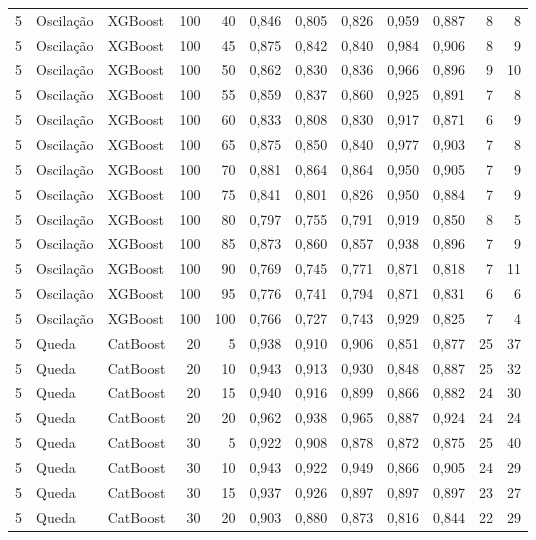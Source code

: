 \begin{longtable}{@{}rllrrrrrrrrr@{}}
5 & Oscilação & XGBoost & 100 & 40 & 0,846 & 0,805 & 0,826 & 0,959 & 0,887 & 8 & 8 \\
5 & Oscilação & XGBoost & 100 & 45 & 0,875 & 0,842 & 0,840 & 0,984 & 0,906 & 8 & 9 \\
5 & Oscilação & XGBoost & 100 & 50 & 0,862 & 0,830 & 0,836 & 0,966 & 0,896 & 9 & 10 \\
5 & Oscilação & XGBoost & 100 & 55 & 0,859 & 0,837 & 0,860 & 0,925 & 0,891 & 7 & 8 \\
5 & Oscilação & XGBoost & 100 & 60 & 0,833 & 0,808 & 0,830 & 0,917 & 0,871 & 6 & 9 \\
5 & Oscilação & XGBoost & 100 & 65 & 0,875 & 0,850 & 0,840 & 0,977 & 0,903 & 7 & 8 \\
5 & Oscilação & XGBoost & 100 & 70 & 0,881 & 0,864 & 0,864 & 0,950 & 0,905 & 7 & 9 \\
5 & Oscilação & XGBoost & 100 & 75 & 0,841 & 0,801 & 0,826 & 0,950 & 0,884 & 7 & 9 \\
5 & Oscilação & XGBoost & 100 & 80 & 0,797 & 0,755 & 0,791 & 0,919 & 0,850 & 8 & 5 \\
5 & Oscilação & XGBoost & 100 & 85 & 0,873 & 0,860 & 0,857 & 0,938 & 0,896 & 7 & 9 \\
5 & Oscilação & XGBoost & 100 & 90 & 0,769 & 0,745 & 0,771 & 0,871 & 0,818 & 7 & 11 \\
5 & Oscilação & XGBoost & 100 & 95 & 0,776 & 0,741 & 0,794 & 0,871 & 0,831 & 6 & 6 \\
5 & Oscilação & XGBoost & 100 & 100 & 0,766 & 0,727 & 0,743 & 0,929 & 0,825 & 7 & 4 \\
5 & Queda & CatBoost & 20 & 5 & 0,938 & 0,910 & 0,906 & 0,851 & 0,877 & 25 & 37 \\
5 & Queda & CatBoost & 20 & 10 & 0,943 & 0,913 & 0,930 & 0,848 & 0,887 & 25 & 32 \\
5 & Queda & CatBoost & 20 & 15 & 0,940 & 0,916 & 0,899 & 0,866 & 0,882 & 24 & 30 \\
5 & Queda & CatBoost & 20 & 20 & 0,962 & 0,938 & 0,965 & 0,887 & 0,924 & 24 & 24 \\
5 & Queda & CatBoost & 30 & 5 & 0,922 & 0,908 & 0,878 & 0,872 & 0,875 & 25 & 40 \\
5 & Queda & CatBoost & 30 & 10 & 0,943 & 0,922 & 0,949 & 0,866 & 0,905 & 24 & 29 \\
5 & Queda & CatBoost & 30 & 15 & 0,937 & 0,926 & 0,897 & 0,897 & 0,897 & 23 & 27 \\
5 & Queda & CatBoost & 30 & 20 & 0,903 & 0,880 & 0,873 & 0,816 & 0,844 & 22 & 29 \\

\end{longtable}
